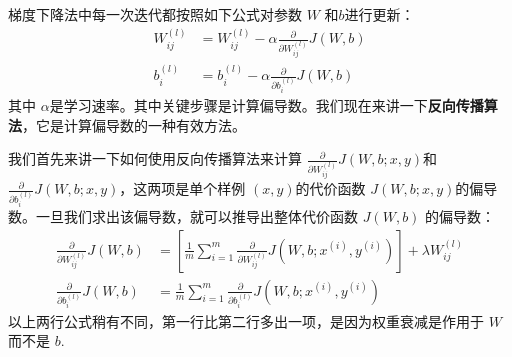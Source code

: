 梯度下降法中每一次迭代都按照如下公式对参数 $ W$ 和$ b $进行更新：
\begin{align}
W_{ij}^{(l)} &= W_{ij}^{(l)} - \alpha \frac{\partial}{\partial W_{ij}^{(l)}} J(W,b) \nonumber \\
b_{i}^{(l)} &= b_{i}^{(l)} - \alpha \frac{\partial}{\partial b_{i}^{(l)}} J(W,b)
\nonumber \end{align}
其中 $ \alpha $是学习速率。其中关键步骤是计算偏导数。我们现在来讲一下\textbf{反向传播算法}，它是计算偏导数的一种有效方法。

我们首先来讲一下如何使用反向传播算法来计算 $ \frac{\partial}{\partial W_{ij}^{(l)}} J(W,b; x, y) $和  $ \frac{\partial}{\partial b_{i}^{(l)}} J(W,b; x, y)$，这两项是单个样例 $ (x,y) $的代价函数 $ J(W,b;x,y) $的偏导数。一旦我们求出该偏导数，就可以推导出整体代价函数 $ J(W,b)$ 的偏导数：
\begin{align}
\frac{\partial}{\partial W_{ij}^{(l)}} J(W,b) &=
\left[ \frac{1}{m} \sum_{i=1}^m \frac{\partial}{\partial W_{ij}^{(l)}} J(W,b; x^{(i)}, y^{(i)}) \right] + \lambda W_{ij}^{(l)} \nonumber \\
\frac{\partial}{\partial b_{i}^{(l)}} J(W,b) &=
\frac{1}{m}\sum_{i=1}^m \frac{\partial}{\partial b_{i}^{(l)}} J(W,b; x^{(i)}, y^{(i)})
\nonumber \end{align}
以上两行公式稍有不同，第一行比第二行多出一项，是因为权重衰减是作用于 $ W $而不是 $ b$.

